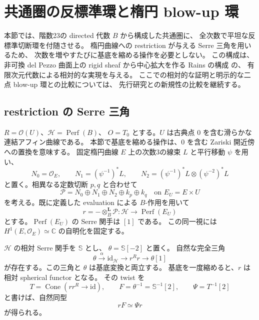 \section{共通圏の反標準環と楕円 blow-up 環}
\label{sec:anticanonical-common-ring}

本節では、階数23の directed 代数 $B$ から構成した共通圏に、
全次数で平坦な反標準切断環を付随させる。
楕円曲線への restriction が与える Serre 三角を用いるため、
次数を増やすたびに基底を縮める操作を必要としない。
この構成は、非可換 del Pezzo 曲面上の rigid sheaf から中心拡大を作る
Rains の構成 \cite[命題5.1]{PencilRainsFiltered} の、
有限次元代数による相対的な実現を与える。
ここでの相対的な証明と明示的な二点 blow-up 環との比較については、
先行研究との新規性の比較を継続する。

\subsection{restriction の Serre 三角}

$R=\mathcal O(U)$、$\mathcal H=\operatorname{Perf}(B)$、
$O=T_0$ とする。$U$ は古典点 $0$ を含む滑らかな連結アフィン曲線である。
本節で基底を縮める操作は、$0$ を含む Zariski 開近傍への置換を意味する。
固定楕円曲線 $E$ 上の次数3の線束 $L$ と平行移動 $\psi$ を用い、
\[
 N_0=\mathcal O_E,\qquad
 N_1=(\psi^{-1})^*L,\qquad
 N_2=(\psi^{-1})^*L\otimes(\psi^{-2})^*L
\]
と置く。相異なる定数切断 $p,q$ と合わせて
\[
 \mathcal P=N_0\oplus N_1\oplus N_2\oplus k_p\oplus k_q
 \quad\text{on }E_U=E\times U
\]
を考える。既に定義した evaluation による $B$-作用を用いて
\[
 r=-\otimes_B^{\mathbf L}\mathcal P\colon
 \mathcal H\longrightarrow\operatorname{Perf}(E_U)
\]
とする。$\operatorname{Perf}(E_U)$ の Serre 関手は $[1]$ である。
この同一視には $H^1(E,\mathcal O_E)\simeq\mathbb C$ の自明化を固定する。

\begin{lemma}\label{lem:ac-serre-triangle}
$\mathcal H$ の相対 Serre 関手を $\mathbb S$ とし、
$\theta=\mathbb S[-2]$ と置く。
自然な完全三角
\begin{equation}\label{eq:ac-serre-triangle}
 \theta\xrightarrow{\alpha}\mathrm{id}_{\mathcal H}
 \longrightarrow r^Rr\longrightarrow\theta[1]
\end{equation}
が存在する。この三角と $\theta$ は基底変換と両立する。
基底を一度縮めると、$r$ は相対 spherical functor となる。
その twist を
\[
 T=\operatorname{Cone}(rr^R\longrightarrow\mathrm{id}),\qquad
 F=\theta^{-1}=\mathbb S^{-1}[2],\qquad
 \Psi=T^{-1}[2]
\]
と書けば、自然同型
\begin{equation}\label{eq:ac-intertwining}
                 rF\simeq\Psi r
\end{equation}
が得られる。
\end{lemma}

